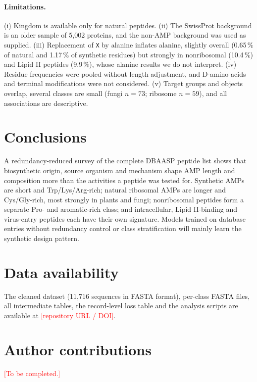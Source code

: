 \documentclass[11pt,a4paper]{article}
\newcommand{\todo}[1]{\textcolor{red}{[#1]}}
\begin{document}
\paragraph{Limitations.}
(i) Kingdom is available only for natural peptides. (ii) The SwissProt background is an older sample of 5{,}002 proteins, and the non-AMP background was used as supplied.
(iii) Replacement of \texttt{X} by alanine inflates alanine, slightly overall (0.65\,\% of natural and 1.17\,\% of synthetic residues) but strongly in nonribosomal (10.4\,\%) and Lipid II peptides (9.9\,\%), whose alanine results we do not interpret.
(iv) Residue frequencies were pooled without length adjustment, and D-amino acids and terminal modifications were not considered. (v) Target groups and objects overlap, several classes are small (fungi $n=73$; ribosome $n=59$),
and all associations are descriptive.

\section{Conclusions}
A redundancy-reduced survey of the complete DBAASP peptide list shows that biosynthetic origin, source organism and mechanism shape AMP length and composition more than the activities a peptide was tested for.
Synthetic AMPs are short and Trp/Lys/Arg-rich; natural ribosomal AMPs are longer and Cys/Gly-rich, most strongly in plants and fungi; nonribosomal peptides form a separate Pro- and aromatic-rich class;
and intracellular, Lipid II-binding and virus-entry peptides each have their own signature. Models trained on database entries without redundancy control or class stratification will mainly learn the synthetic design pattern.

\section*{Data availability}
The cleaned dataset (11{,}716 sequences in FASTA format), per-class FASTA files, all intermediate tables, the record-level loss table and the analysis scripts are available at \todo{repository URL / DOI}.

\section*{Author contributions}
\todo{To be completed.}
\end{document}
